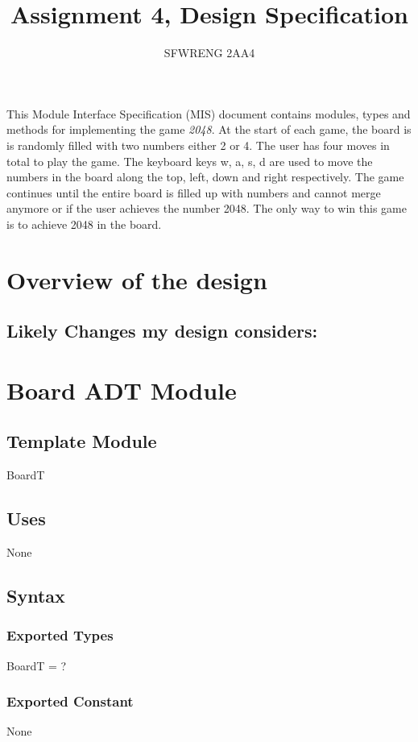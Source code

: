 \documentclass[12pt]{article}
\title{Assignment 4, Design Specification}
\author{SFWRENG 2AA4}
\begin{document}
\maketitle
This Module Interface Specification (MIS) document contains modules, types and
methods for implementing the game \textit{2048}. At the start of each game, the board is is randomly filled with two numbers either 2 or 4. The user has four moves in total to play the game. The keyboard keys w, a, s, d are used to move the numbers in the board along the top, left, down and right respectively. The game continues until the entire board is filled up with numbers and cannot merge anymore or if the user achieves the number 2048. The only way to win this game is to achieve 2048 in the board.

\section{Overview of the design}


\subsection*{Likely Changes my design considers:}

\newpage

\section* {Board ADT Module}

\subsection*{Template Module}

BoardT

\subsection* {Uses}
None
\subsection* {Syntax}
\subsubsection* {Exported Types}
BoardT = ?
\subsubsection* {Exported Constant}
None
\end{document}
